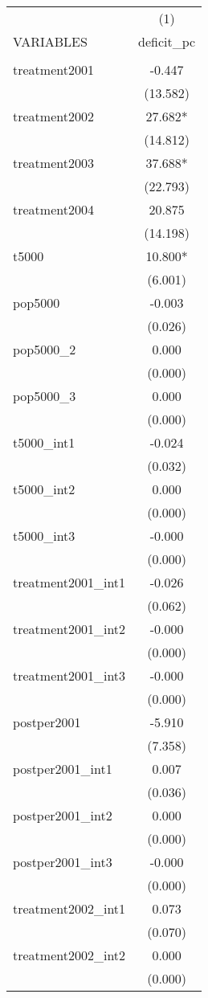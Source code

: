 \documentclass[]{article}
\begin{document}
\begin{tabular}{lc} \hline
 & (1) \\
VARIABLES & deficit\_pc \\ \hline
 &  \\
treatment2001 & -0.447 \\
 & (13.582) \\
treatment2002 & 27.682* \\
 & (14.812) \\
treatment2003 & 37.688* \\
 & (22.793) \\
treatment2004 & 20.875 \\
 & (14.198) \\
t5000 & 10.800* \\
 & (6.001) \\
pop5000 & -0.003 \\
 & (0.026) \\
pop5000\_2 & 0.000 \\
 & (0.000) \\
pop5000\_3 & 0.000 \\
 & (0.000) \\
t5000\_int1 & -0.024 \\
 & (0.032) \\
t5000\_int2 & 0.000 \\
 & (0.000) \\
t5000\_int3 & -0.000 \\
 & (0.000) \\
treatment2001\_int1 & -0.026 \\
 & (0.062) \\
treatment2001\_int2 & -0.000 \\
 & (0.000) \\
treatment2001\_int3 & -0.000 \\
 & (0.000) \\
postper2001 & -5.910 \\
 & (7.358) \\
postper2001\_int1 & 0.007 \\
 & (0.036) \\
postper2001\_int2 & 0.000 \\
 & (0.000) \\
postper2001\_int3 & -0.000 \\
 & (0.000) \\
treatment2002\_int1 & 0.073 \\
 & (0.070) \\
treatment2002\_int2 & 0.000 \\
 & (0.000) \\

\end{tabular}
\end{document}
